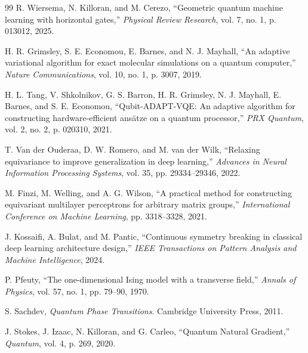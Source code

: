\documentclass[pdflatex,sn-mathphys-num]{sn-jnl}
\theoremstyle{thmstyleone}
\theoremstyle{thmstyletwo}
\theoremstyle{thmstylethree}
\begin{document}
\begin{thebibliography}{99}
R. Wiersema, N. Killoran, and M. Cerezo, ``Geometric quantum machine learning with horizontal gates,'' \textit{Physical Review Research}, vol. 7, no. 1, p. 013012, 2025.

H. R. Grimsley, S. E. Economou, E. Barnes, and N. J. Mayhall, ``An adaptive variational algorithm for exact molecular simulations on a quantum computer,'' \textit{Nature Communications}, vol. 10, no. 1, p. 3007, 2019.

H. L. Tang, V. Shkolnikov, G. S. Barron, H. R. Grimsley, N. J. Mayhall, E. Barnes, and S. E. Economou, ``Qubit-ADAPT-VQE: An adaptive algorithm for constructing hardware-efficient ans\"atze on a quantum processor,'' \textit{PRX Quantum}, vol. 2, no. 2, p. 020310, 2021.

T. Van der Ouderaa, D. W. Romero, and M. van der Wilk, ``Relaxing equivariance to improve generalization in deep learning,'' \textit{Advances in Neural Information Processing Systems}, vol. 35, pp. 29334--29346, 2022.

M. Finzi, M. Welling, and A. G. Wilson, ``A practical method for constructing equivariant multilayer perceptrons for arbitrary matrix groups,'' \textit{International Conference on Machine Learning}, pp. 3318--3328, 2021.

J. Kossaifi, A. Bulat, and M. Pantic, ``Continuous symmetry breaking in classical deep learning architecture design,'' \textit{IEEE Transactions on Pattern Analysis and Machine Intelligence}, 2024.

P. Pfeuty, ``The one-dimensional Ising model with a transverse field,'' \textit{Annals of Physics}, vol. 57, no. 1, pp. 79--90, 1970.

S. Sachdev, \textit{Quantum Phase Transitions}. Cambridge University Press, 2011.

J. Stokes, J. Izaac, N. Killoran, and G. Carleo, ``Quantum Natural Gradient,'' \textit{Quantum}, vol. 4, p. 269, 2020.

\end{thebibliography}
\end{document}
